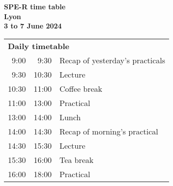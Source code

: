 \documentclass[a4paper, 12pt]{article}
\begin{document}
\begin{center}
\huge \bf SPE-R time table \\
\large \bf Lyon  \\
\large \bf 3 to 7 June  2024 \\
\end{center}

\noindent
\begin{tabular}{r@{ -- }rp{13cm}}
\multicolumn{3}{l}{\bf Daily timetable} \\
 9:00 &  9:30 & Recap of yesterday's practicals \\
 9:30 & 10:30 & Lecture \\
10:30 & 11:00 & Coffee break \\
11:00 & 13:00 & Practical \\
13:00 & 14:00 & Lunch \\
14:00 & 14:30 & Recap of morning's practical \\
14:30 & 15:30 & Lecture \\
15:30 & 16:00 & Tea break \\
16:00 & 18:00 & Practical \\[2em]
\end{tabular}
\end{document}
